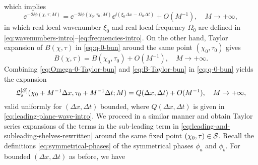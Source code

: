 which implies
\begin{equation}
\ee^{-2\ii \phi(\chi,\tau;M)} = \ee^{-2\ii \phi (\chi_0,\tau_0;M)} \ee^{\ii(\xi_0\Delta x - \Omega_0 \Delta t)} + O(M^{-1}),\quad M\to +\infty,
\label{eq:Omega-0-Taylor-bun}
\end{equation}
in which real local wavenumber $\xi_0$ and real local frequency $\Omega_0$ are defined in \eqref{eq:wavenumbers-intro}--\eqref{eq:frequencies-intro}. On the other hand, Taylor expansion of $B(\chi,\tau)$ in \eqref{eq:q-0-bun} around the same point $(\chi_0,\tau_0)$ gives
\begin{equation}
B(\chi,\tau) = B(\chi_0,\tau_0) + O(M^{-1}),\quad M\to +\infty.
\label{eq:B-Taylor-bun}
\end{equation}
Combining \eqref{eq:Omega-0-Taylor-bun} and \eqref{eq:B-Taylor-bun} in \eqref{eq:q-0-bun} yields the expansion
\begin{equation}
\mathfrak{L}_s^{[\mathcal{S}]}(\chi_0+M^{-1}\Delta x,\tau_0+M^{-1}\Delta t;M)
=Q(\Delta x, \Delta t) + O(M^{-1}),\quad M\to +\infty,
\label{eq:Q-0-expand}
\end{equation}
valid uniformly for $(\Delta x,\Delta t)$ bounded, where $Q(\Delta x, \Delta t)$ is given in \eqref{eq:leading-plane-wave-intro}. 
We proceed in a similar manner and obtain Taylor series expansions of the terms in the sub-leading term in  \eqref{eq:leading-and-subleading-shelves-rewritten} around the same fixed point $(\chi_0,\tau) \in \mathcal{S}$. Recall the definitions \eqref{eq:symmetrical-phases} of the symmetrical phases $\phi_a$ and $\phi_b$. For bounded $(\Delta x, \Delta t)$ as before, we have
